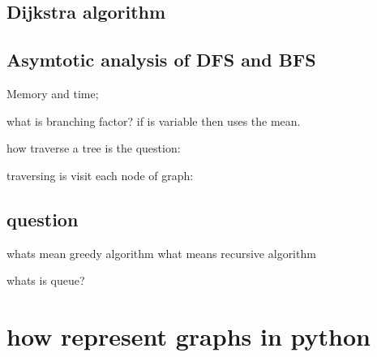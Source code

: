 \documentclass[10pt,a4paper]{article}
\begin{document}
\subsection{Dijkstra algorithm}




\subsection{Asymtotic analysis of DFS and BFS}

Memory and time;


what  is branching factor?
if is variable then uses the mean.



how traverse a tree is the question:


traversing is visit each node of graph:



\subsection{question}
whats mean greedy algorithm
what means recursive algorithm



whats is queue?



\section{how represent graphs in python}
\end{document}
